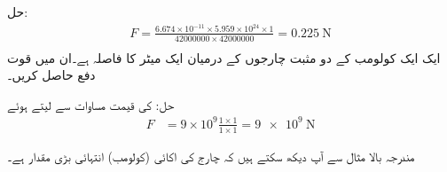 حل: 
\begin{align*}
F=\frac{6.674 \times 10^{-11} \times 5.959 \times 10^{24} \times 1}{\num{42000000} \times \num{42000000}}=\SI{0.225}{\newton}\\
\end{align*}
ایک ایک کولومب کے دو مثبت چارجوں کے درمیان  ایک میٹر کا فاصلہ ہے۔ان میں قوت دفع حاصل کریں۔

حل:  کی قیمت مساوات  سے لیتے ہوئے
\begin{align*}
F&=9 \times 10^9 \frac{1 \times 1}{1 \times 1}=\SI{9e9}{\newton}
\end{align*}

مندرجہ بالا مثال سے  آپ دیکھ سکتے ہیں کہ چارج کی اکائی (کولومب)  انتہائی بڑی مقدار ہے۔

